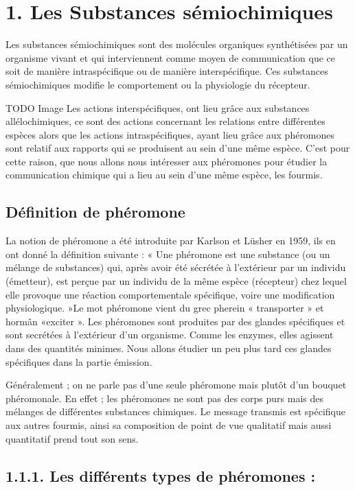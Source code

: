 \section{1. Les Substances sémiochimiques}

Les substances sémiochimiques sont des molécules organiques synthétisées
par un organisme vivant et qui interviennent comme moyen de
communication que ce soit de manière intraspécifique ou de manière
interspécifique. Ces substances sémiochimiques modifie le comportement
ou la physiologie du récepteur.

TODO Image Les actions interspécifiques, ont lieu grâce aux substances
allélochimiques, ce sont des actions concernant les relations entre
différentes espèces alors que les actions intraspécifiques, ayant lieu
grâce aux phéromones sont relatif aux rapports qui se produisent au sein
d'une même espèce. C'est pour cette raison, que nous allons nous
intéresser aux phéromones pour étudier la communication chimique qui a
lieu au sein d'une même espèce, les fourmis.

\subsection{Définition de phéromone}

La notion de phéromone a été introduite par Karlson et Lüsher en 1959,
ils en ont donné la définition suivante : « Une phéromone est une
substance (ou un mélange de substances) qui, après avoir été sécrétée à
l'extérieur par un individu (émetteur), est perçue par un individu de la
même espèce (récepteur) chez lequel elle provoque une réaction
comportementale spécifique, voire une modification physiologique. »Le
mot phéromone vient du grec pherein « transporter » et hormân «exciter
». Les phéromones sont produites par des glandes spécifiques et sont
secrétées à l'extérieur d'un organisme. Comme les enzymes, elles
agissent dans des quantités minimes. Nous allons étudier un peu plus
tard ces glandes spécifiques dans la partie émission.

Généralement ; on ne parle pas d'une seule phéromone mais plutôt d'un
bouquet phéromonale. En effet ; les phéromones ne sont pas des corps
purs mais des mélanges de différentes substances chimiques. Le message
transmis est spécifique aux autres fourmis, ainsi sa composition de
point de vue qualitatif mais aussi quantitatif prend tout son sens.

\subsection{1.1.1. Les différents types de phéromones :}

